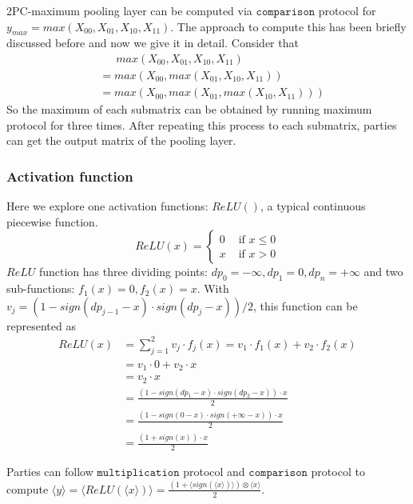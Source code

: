 \documentclass[letterpaper]{article} %
\begin{document}
    2PC-maximum pooling layer can be computed via $\mathtt{comparison}$ protocol for
    $y_{max}=max(X_{00}, X_{01}, X_{10}, X_{11})$.
    The approach to compute this has been briefly discussed before and now we give it in detail.
    Consider that
    \begin{align*}
        &\enspace \enspace \enspace  max(X_{00}, X_{01}, X_{10}, X_{11}) \\
        &= max(X_{00},max(X_{01}, X_{10}, X_{11})) \\
      &= max(X_{00},max(X_{01},max(X_{10}, X_{11})))
    \end{align*}
    So the maximum of each submatrix can be obtained by running
    maximum protocol for three times.
    After repeating this process to each submatrix, parties can get the output matrix of the pooling layer.


    \subsubsection{Activation function}
    Here we explore one  activation functions: $ReLU()$, a typical continuous piecewise function.
    $$ReLU(x)=\begin{cases}
        0 & \text{ if } x \leqslant 0  \\
        x & \text{ if } x > 0
        \end{cases}$$
    $ReLU$ function has three dividing points: $dp_{0}= -\infty ,dp_{1}= 0, dp_{n}=+\infty$ and two sub-functions:
    $f_{1}(x)= 0 ,f_{2}(x)= x$.
    With $v_{j} = (1-sign(dp_{j-1}-x)\cdot sign(dp_{j}-x))/2$, this function can be represented as
    \begin{align*}
        ReLU(x)&=\sum_{j=1}^{2}v_{j}\cdot f_{j}(x)=v_{1}\cdot f_{1}(x)+v_{2}\cdot f_{2}(x)\\
        &=v_{1}\cdot 0 +v_{2}\cdot x\\
        &=v_{2}\cdot x\\
        &=\frac{(1-sign(dp_{1}-x)\cdot sign(dp_{2}-x))\cdot x}{2} \\
        &=\frac{(1-sign(0-x)\cdot sign(+\infty -x))\cdot x}{2} \\
        &=\frac{(1+sign(x))\cdot x}{2}
    \end{align*}

    Parties can follow $\mathtt{multiplication}$ protocol and $\mathtt{comparison}$ protocol to compute
    $\langle y\rangle=\langle ReLU(\langle x\rangle)\rangle=\frac{(1+\langle sign(\langle x\rangle)\rangle)\otimes \langle x\rangle}{2}$.
\end{document}
